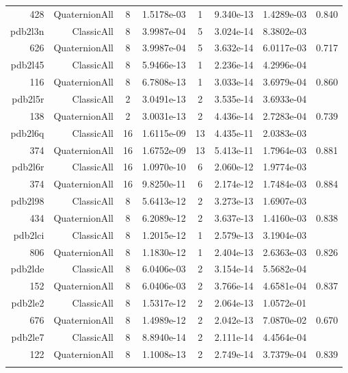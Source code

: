\begin{xltabular}{\textwidth}{r|rcS[table-format=1.4e+2]cS[table-format=1.3e+2]S[table-format=1.4e+2]S[table-format=-1.3]}
428 & QuaternionAll & 8 & 1.5178e-03 & 1 & 9.340e-13 & 1.4289e-03 & 0.840\\  \addlinespace
pdb2l3n & ClassicAll & 8 & 3.9987e-04 & 5 & 3.024e-14 & 8.3802e-03 & \\
626 & QuaternionAll & 8 & 3.9987e-04 & 5 & 3.632e-14 & 6.0117e-03 & 0.717\\  \addlinespace
pdb2l45 & ClassicAll & 8 & 5.9466e-13 & 1 & 2.236e-14 & 4.2996e-04 & \\
116 & QuaternionAll & 8 & 6.7808e-13 & 1 & 3.033e-14 & 3.6979e-04 & 0.860\\  \addlinespace
pdb2l5r & ClassicAll & 2 & 3.0491e-13 & 2 & 3.535e-14 & 3.6933e-04 & \\
138 & QuaternionAll & 2 & 3.0031e-13 & 2 & 4.436e-14 & 2.7283e-04 & 0.739\\  \addlinespace
pdb2l6q & ClassicAll & 16 & 1.6115e-09 & 13 & 4.435e-11 & 2.0383e-03 & \\
374 & QuaternionAll & 16 & 1.6752e-09 & 13 & 5.413e-11 & 1.7964e-03 & 0.881\\  \addlinespace
pdb2l6r & ClassicAll & 16 & 1.0970e-10 & 6 & 2.060e-12 & 1.9774e-03 & \\
374 & QuaternionAll & 16 & 9.8250e-11 & 6 & 2.174e-12 & 1.7484e-03 & 0.884\\  \addlinespace
pdb2l98 & ClassicAll & 8 & 5.6413e-12 & 2 & 3.273e-13 & 1.6907e-03 & \\
434 & QuaternionAll & 8 & 6.2089e-12 & 2 & 3.637e-13 & 1.4160e-03 & 0.838\\  \addlinespace
pdb2lci & ClassicAll & 8 & 1.2015e-12 & 1 & 2.579e-13 & 3.1904e-03 & \\
806 & QuaternionAll & 8 & 1.1830e-12 & 1 & 2.404e-13 & 2.6363e-03 & 0.826\\  \addlinespace
pdb2lde & ClassicAll & 8 & 6.0406e-03 & 2 & 3.154e-14 & 5.5682e-04 & \\
152 & QuaternionAll & 8 & 6.0406e-03 & 2 & 3.766e-14 & 4.6581e-04 & 0.837\\  \addlinespace
{\color{red} pdb2le2 } & ClassicAll & 8 & 1.5317e-12 & 2 & 2.064e-13 & 1.0572e-01 & \\
676 & QuaternionAll & 8 & 1.4989e-12 & 2 & 2.042e-13 & 7.0870e-02 & 0.670\\  \addlinespace
pdb2le7 & ClassicAll & 8 & 8.8940e-14 & 2 & 2.111e-14 & 4.4564e-04 & \\
122 & QuaternionAll & 8 & 1.1008e-13 & 2 & 2.749e-14 & 3.7379e-04 & 0.839\\  \addlinespace

\end{xltabular}
